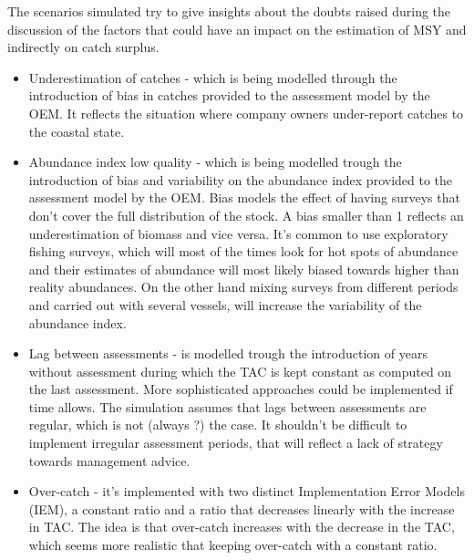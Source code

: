 \documentclass[a4paper]{article}
\begin{document}
The scenarios simulated try to give insights about the doubts raised during the discussion of the factors that could have an impact on the estimation of MSY and indirectly on catch surplus.

\begin{itemize}
	\item Underestimation of catches - which is being modelled through the introduction of bias in catches provided to the assessment model by the OEM. It reflects the situation where company owners under-report catches to the coastal state. 
	\item Abundance index low quality - which is being modelled trough the introduction of bias and variability on the abundance index provided to the assessment model by the OEM. Bias models the effect of having surveys that don't cover the full distribution of the stock. A bias smaller than 1 reflects an underestimation of biomass and vice versa. It's common to use exploratory fishing surveys, which will most of the times look for hot spots of abundance and their estimates of abundance will most likely biased towards higher than reality abundances. On the other hand mixing surveys from different periods and carried out with several vessels, will increase the variability of the abundance index. 
	\item Lag between assessments - is modelled trough the introduction of years without assessment during which the TAC is kept constant as computed on the last assessment. More sophisticated approaches could be implemented if time allows. The simulation assumes that lags between assessments are regular, which is not (always ?) the case. It shouldn't be difficult to implement irregular assessment periods, that will reflect a lack of strategy towards management advice.
	\item Over-catch - it's implemented with two distinct Implementation Error Models (IEM), a constant ratio and a ratio that decreases linearly with the increase in TAC. The idea is that over-catch increases with the decrease in the TAC, which seems more realistic that keeping over-catch with a constant ratio.  
\end{itemize}     
\end{document}
